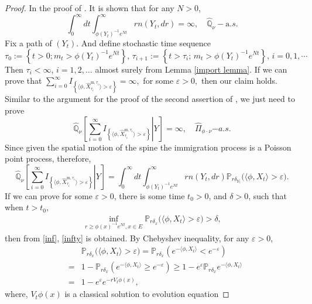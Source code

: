 \documentclass[12pt,a4paper]{amsart}
\numberwithin{equation}{section}
\theoremstyle{plain}
\theoremstyle{definition}
\theoremstyle{remark}
\begin{document}
\begin{proof}
	In the proof of \cite[Lemma $3.2$]{LiuRenSong2009Llog}.  It is shown that for any $N>0$,
\begin{equation}\label{inf}
	\int_0^\infty dt\int_{\phi(Y_t)^{-1}e^{Nt}}^\infty rn(Y_t,dr)
	=\infty,\quad \widehat{\mathbb Q}_\nu-{\mathrm a.s.}
\end{equation}
	Fix a path of $(Y_t)$.  And define stochastic
	time sequence
\[
	\tau_0:=\left\{t>0; m_t>\phi(Y_t)^{-1}e^{Nt}\right\},\,
	\tau_{i+1}:=\left\{t>\tau_i;\, m_t>\phi(Y_t)^{-1}e^{Nt}\right\},\, i=0,1,\cdots
\]
	Then $\tau_i<\infty$, $i=1,2,\ldots$ almost surely from Lemma \ref{import lemma}.
	If we can prove that $\sum_{i=0}^\infty I_{\left\{\langle\phi, \widehat X^{{\mathrm m},\tau_i}_{\tau_i}\rangle  >\varepsilon\right\}}=\infty,$ for some $\varepsilon>0,$ then our claim holds.  Similar to the argument for the proof of the second assertion of \cite[Lemma $2.2$]{LiuRenSong2009Llog}, we just need to prove
\[
	\widehat{\mathbb Q}_\nu
	\left[\left.\sum_{i=0}^\infty I_{\left\{\langle\phi, \widehat X^{{\mathrm m},\tau_i}_{\tau_i}\rangle  >\varepsilon\right\}} \right| Y\right]=\infty,\quad \widehat\Pi_{\phi\cdot\nu}{\mathrm -a.s.}
\]
	Since given the spatial motion of the spine the immigration process is a Poisson point process, therefore,
\[
	\widehat{\mathbb Q}_\nu\left[\left.\sum_{i=0}^\infty I_{\left\{\langle\phi, \widehat X^{{\mathrm m},\tau_i}_{\tau_i}\rangle  >\varepsilon\right\}}\right| Y\right]=\int_0^\infty dt\int_{\phi(Y_t)^{-1}e^{Nt}}^\infty rn(Y_t, dr)\mathbb{P}_{r\delta_{Y_t}}\big(\langle\phi, X_t \rangle >\varepsilon\big).
\]
	If we can prove for some $\varepsilon>0$, there is some time $t_0>0$, and $\delta>0$, such that when $t>t_0$,
\begin{eqnarray}\label{last point}
	\inf_{r\geq \phi(x)^{-1}e^{Nt}, x\in E}\mathbb P_{r\delta_x}\big(\langle\phi, X_t
	\rangle >\varepsilon\big)>\delta,
\end{eqnarray}
	then from \eqref{inf}, \eqref{infty} is obtained.  By Chebyshev inequality, for any $\varepsilon>0$,
\begin{eqnarray*}
	&&\mathbb P_{r\delta_x}\big(\langle\phi, X_t\rangle >\varepsilon\big)=\mathbb P_{r\delta_x}\left(e^{-\langle\phi, X_t\rangle }<e^{-\varepsilon}\right)\\
	&=&1-\mathbb P_{r\delta_x}\left(e^{-\langle\phi, X_t
	\rangle }\geq e^{-\varepsilon}\right)\geq 1-e^{\varepsilon }\mathbb P_{r\delta_x}e^{-\langle\phi, X_t\rangle }\\
	&=&1-e^{\varepsilon }e^{-rV_t\phi(x)},
\end{eqnarray*}
	where, $V_t\phi(x)$ is a classical solution to evolution equation

\end{proof}
\end{document}
